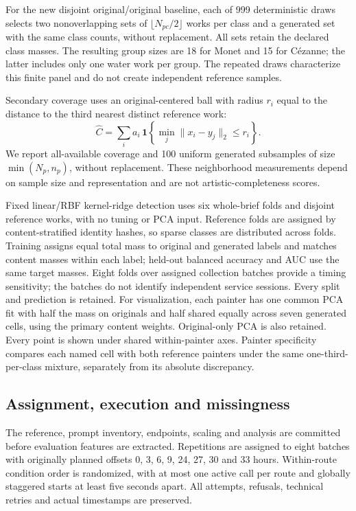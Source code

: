 \documentclass[11pt]{article}
\begin{document}
For the new disjoint original/original baseline, each of 999 deterministic draws
selects two nonoverlapping sets of $\lfloor N_{pc}/2\rfloor$ works per class and a
generated set with the same class counts, without replacement. All sets retain
the declared class masses. The resulting group sizes are 18 for Monet and 15 for
Cézanne; the latter includes only one water work per group. The repeated draws
characterize this finite panel and do not create independent reference samples.

Secondary coverage uses an original-centered ball with radius $r_i$ equal to
the distance to the third nearest distinct reference work:
\begin{equation}
 \widehat{C}=\sum_i a_i\,\mathbf{1}
 \!\left\{\min_j\lVert x_i-y_j\rVert_2\leq r_i\right\}.
\end{equation}
We report all-available coverage and 100 uniform generated subsamples of size
$\min(N_p,n_p)$, without replacement. These neighborhood measurements depend on
sample size and representation and are not artistic-completeness scores.

Fixed linear/RBF kernel-ridge detection uses six whole-brief folds and disjoint
reference works, with no tuning or PCA input. Reference folds are assigned by
content-stratified identity hashes, so sparse classes are distributed across
folds. Training assigns equal total mass to original and generated labels and
matches content masses within each label; held-out balanced accuracy and AUC use
the same target masses. Eight folds over assigned collection batches provide a
timing sensitivity; the batches do not identify independent service sessions.
Every split and prediction is retained. For visualization, each painter has one
common PCA fit with half the mass on originals and half shared equally across
seven generated cells, using the primary content weights. Original-only PCA is
also retained. Every point is shown under shared within-painter axes. Painter
specificity compares each named cell with both reference painters under the
same one-third-per-class mixture, separately from its absolute discrepancy.

\subsection{Assignment, execution and missingness}
The reference, prompt inventory, endpoints, scaling and analysis are committed
before evaluation features are extracted. Repetitions are assigned to eight
batches with originally planned offsets 0, 3, 6, 9, 24, 27, 30 and 33 hours.
Within-route condition order is randomized, with at most one active call per
route and globally staggered starts at least five seconds apart. All attempts,
refusals, technical retries and actual timestamps are preserved.
\end{document}
